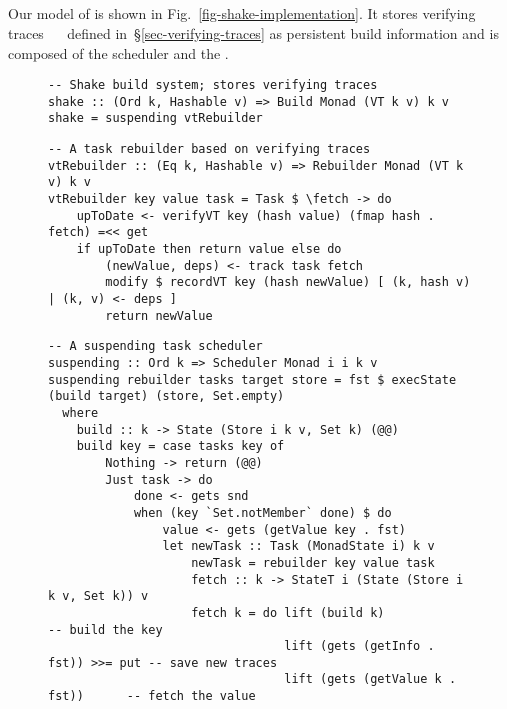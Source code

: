\vspace{-1mm}
\subsection{\Shake}\label{sec-implementation-shake}
\vspace{-1mm}

Our model of \Shake is shown in Fig.~\ref{fig-shake-implementation}. It stores
verifying traces ~~ defined in~\S\ref{sec-verifying-traces}
as persistent build information and is composed of the  scheduler
and the .

\begin{figure}
\begin{verbatim}
-- Shake build system; stores verifying traces
shake :: (Ord k, Hashable v) => Build Monad (VT k v) k v
shake = suspending vtRebuilder
\end{verbatim}
\vspace{0mm}
\begin{verbatim}
-- A task rebuilder based on verifying traces
vtRebuilder :: (Eq k, Hashable v) => Rebuilder Monad (VT k v) k v
vtRebuilder key value task = Task $ \fetch -> do
    upToDate <- verifyVT key (hash value) (fmap hash . fetch) =<< get
    if upToDate then return value else do
        (newValue, deps) <- track task fetch
        modify $ recordVT key (hash newValue) [ (k, hash v) | (k, v) <- deps ]
        return newValue
\end{verbatim}
\vspace{0mm}
\begin{verbatim}
-- A suspending task scheduler
suspending :: Ord k => Scheduler Monad i i k v
suspending rebuilder tasks target store = fst $ execState (build target) (store, Set.empty)
  where
    build :: k -> State (Store i k v, Set k) (@@)
    build key = case tasks key of
        Nothing -> return (@@)
        Just task -> do
            done <- gets snd
            when (key `Set.notMember` done) $ do
                value <- gets (getValue key . fst)
                let newTask :: Task (MonadState i) k v
                    newTask = rebuilder key value task
                    fetch :: k -> StateT i (State (Store i k v, Set k)) v
                    fetch k = do lift (build k)                      -- build the key
                                 lift (gets (getInfo . fst)) >>= put -- save new traces
                                 lift (gets (getValue k . fst))      -- fetch the value

\end{verbatim}
\end{figure}
